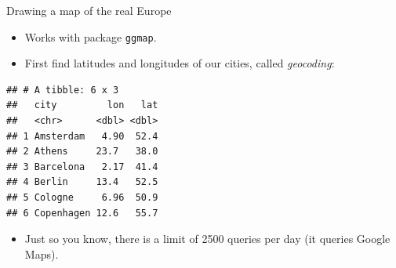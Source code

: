 \documentclass[ignorenonframetext,]{beamer}
\newenvironment{Shaded}{\begin{snugshade}}{\end{snugshade}}
\newcommand{\DataTypeTok}[1]{\textcolor[rgb]{0.13,0.29,0.53}{#1}}
\newcommand{\DecValTok}[1]{\textcolor[rgb]{0.00,0.00,0.81}{#1}}
\newcommand{\KeywordTok}[1]{\textcolor[rgb]{0.13,0.29,0.53}{\textbf{#1}}}
\newcommand{\NormalTok}[1]{#1}
\newcommand{\OperatorTok}[1]{\textcolor[rgb]{0.81,0.36,0.00}{\textbf{#1}}}
\newcommand{\StringTok}[1]{\textcolor[rgb]{0.31,0.60,0.02}{#1}}
\providecommand{\tightlist}{%
  \setlength{\itemsep}{0pt}\setlength{\parskip}{0pt}}
\begin{document}
\begin{frame}[fragile]{Drawing a map of the real Europe}
\protect\hypertarget{drawing-a-map-of-the-real-europe}{}

\begin{itemize}
\item
  Works with package \texttt{ggmap}.
\item
  First find latitudes and longitudes of our cities, called
  \emph{geocoding}:
\end{itemize}

\small

\begin{Shaded}
\end{Shaded}

\normalsize

\small

\begin{verbatim}
## # A tibble: 6 x 3
##   city         lon   lat
##   <chr>      <dbl> <dbl>
## 1 Amsterdam   4.90  52.4
## 2 Athens     23.7   38.0
## 3 Barcelona   2.17  41.4
## 4 Berlin     13.4   52.5
## 5 Cologne     6.96  50.9
## 6 Copenhagen 12.6   55.7
\end{verbatim}

\normalsize

\begin{itemize}
\tightlist
\item
  Just so you know, there is a limit of 2500 queries per day (it queries
  Google Maps).
\end{itemize}

\end{frame}
\end{document}
